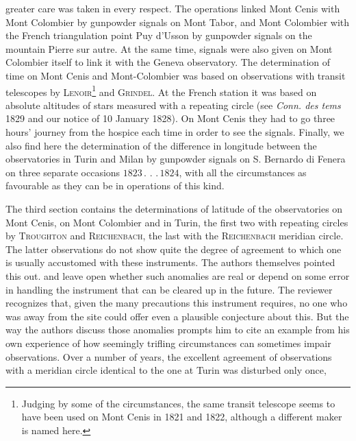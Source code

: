 %
greater care was taken in every respect. The operations linked Mont Cenis with Mont Colombier by gunpowder signals on Mont Tabor, and Mont Colombier with the French triangulation point Puy d’Usson by gunpowder signals on the mountain Pierre sur autre. At the same time, signals were also given on Mont Colombier itself to link it with the Geneva observatory. The determination of time on Mont Cenis and Mont-Colombier was based on observations with transit telescopes by \textsc{Lenoir}\footnote{Judging by some of the circumstances, the same transit telescope seems to have been used on Mont Cenis in 1821 and 1822, although a different maker is named here.} and \textsc{Grindel}. At the French station it was based on absolute altitudes of stars measured with a repeating circle (see \textit{Conn. des tems} 1829 and our notice of 10 January 1828). On Mont Cenis they had to go three hours' journey from the hospice each time in order to see the signals. Finally, we also find here the determination of the difference in longitude between the observatories in Turin and Milan by gunpowder signals on S. Bernardo di Fenera on three separate occasions \(1823\mathpunct{.}\mathpunct{.}\mathpunct{.}1824\), with all the circumstances as favourable as they can be in operations of this kind.

The third section contains the determinations of latitude of the observatories on Mont Cenis, on Mont Colombier and in Turin, the first two with repeating circles by \textsc{Troughton} and \textsc{Reichenbach}, the last with the \textsc{Reichenbach} meridian circle. The latter observations do not show quite the degree of agreement to which one is usually accustomed with these instruments. The authors themselves pointed this out. and leave open whether such anomalies are real or depend on some error in handling the instrument that can be cleared up in the future. The reviewer recognizes that, given the many precautions this instrument requires, no one who was away from the site could offer even a plausible conjecture about this. But the way the authors discuss those anomalies prompts him to cite an example from his own experience of how seemingly trifling circumstances can sometimes impair observations. Over a number of years, the excellent agreement of observations with a meridian circle identical to the one at Turin was disturbed only once,
